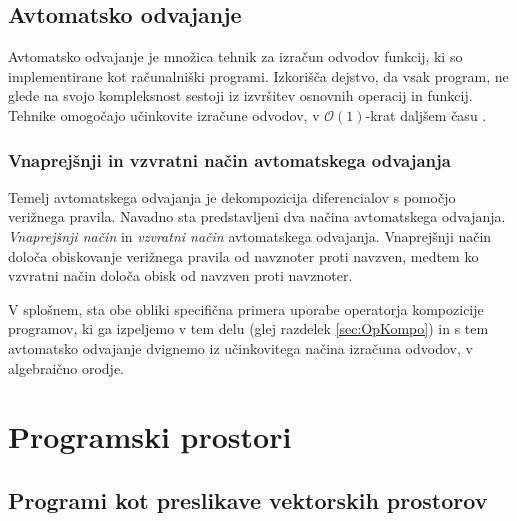 \documentclass[a4paper, 12pt]{book}
\begin{document}
\section{Avtomatsko odvajanje}\label{sec:avtOdv}

Avtomatsko odvajanje je množica tehnik za izračun odvodov funkcij, ki so implementirane kot računalniški programi. Izkorišča dejstvo, da vsak program, ne glede na svojo kompleksnost sestoji iz izvršitev osnovnih operacij in funkcij. Tehnike omogočajo učinkovite izračune odvodov, v $\mathcal{O}(1)$-krat daljšem času \cite{AdSurvey}.

\subsection{Vnaprejšnji in vzvratni način avtomatskega odvajanja}

Temelj avtomatskega odvajanja je dekompozicija diferencialov s pomočjo verižnega pravila. Navadno sta predstavljeni dva načina avtomatskega odvajanja. \emph{Vnaprejšnji način} \cite{PcAD} in \emph{vzvratni način} \cite{ReverseAD} avtomatskega odvajanja. Vnaprejšnji način določa obiskovanje verižnega pravila od navznoter proti navzven, medtem ko vzvratni način določa obisk od navzven proti navznoter.

V splošnem, sta obe obliki specifična primera uporabe operatorja kompozicije programov, ki ga izpeljemo v tem delu (glej razdelek \ref{sec:OpKompo}) in s tem avtomatsko odvajanje dvignemo iz učinkovitega načina izračuna odvodov, v algebraično orodje.

\chapter{Programski prostori} \label{ch:programskiProstori}

\section{Programi kot preslikave vektorskih prostorov}\label{sec:progKotPres}
\end{document}
